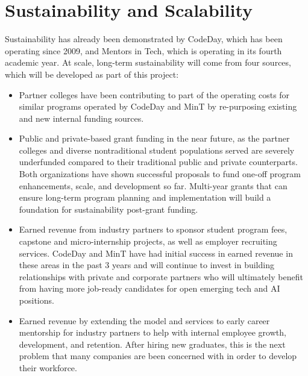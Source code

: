 \section{Sustainability and Scalability}

Sustainability has already been demonstrated by CodeDay, which has been operating since 2009, and Mentors in Tech, which is operating in its fourth academic year.  At scale, long-term sustainability will come from four sources, which will be developed as part of this project:

\begin{itemize}
    \item Partner colleges have been contributing to part of the operating costs for similar programs operated by CodeDay and MinT by re-purposing existing and new internal funding sources.
    
    \item Public and private-based grant funding in the near future, as the partner colleges and diverse nontraditional student populations served are severely underfunded compared to their traditional public and private counterparts. Both organizations have shown successful proposals to fund one-off program enhancements, scale, and development so far. Multi-year grants that can ensure long-term program planning and implementation will build a foundation for sustainability post-grant funding.
    
    \item Earned revenue from industry partners to sponsor student program fees, capstone and micro-internship projects, as well as employer recruiting services. CodeDay and MinT have had initial success in earned revenue in these areas in the past 3 years and will continue to invest in building relationships with private and corporate partners who will ultimately benefit from having more job-ready candidates for open emerging tech and AI positions. 
    
    \item Earned revenue by extending the model and services to early career mentorship for industry partners to help with internal employee growth, development, and retention. After hiring new graduates, this is the next problem that many companies are been concerned with in order to develop their workforce.
\end{itemize}